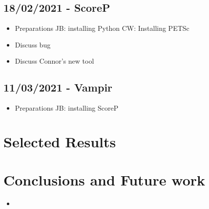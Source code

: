 \documentclass[a4paper,11pt]{article}
\newenvironment{jacknotes}{\color{red}\renewcommand{\labelitemi}{$\star$}\begin{itemize}}{\end{itemize}}
\begin{document}
\clearpage
\subsection{18/02/2021 - ScoreP}
\label{ssec:scorep}
\begin{jacknotes}
	\item Preparations JB: installing Python CW: Installing PETSc
	\item Discuss bug
	\item Discuss Connor's new tool
\end{jacknotes}

\clearpage
\subsection{11/03/2021 - Vampir}
\label{ssec:vampir}
\begin{jacknotes}
	\item Preparations JB: installing ScoreP
\end{jacknotes}

\clearpage
\section{Selected Results}
\label{sec:results}


\clearpage
\section{Conclusions and Future work}
\label{sec:conc}

\begin{itemize}
	\item 
\end{itemize}
\end{document}
